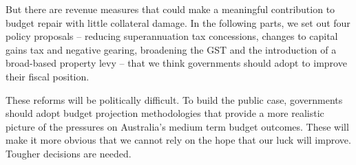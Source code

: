\documentclass[twoside,english]{Dianab5ona4portrait}
\begin{document}
But there are revenue measures that could make a meaningful contribution to budget repair with little collateral damage. In the following parts, we set out four policy proposals – reducing superannuation tax concessions, changes to capital gains tax and negative gearing, broadening the GST and the introduction of a broad-based property levy – that we think governments should adopt to improve their fiscal position.

These reforms will be politically difficult. To build the public case, governments should adopt budget projection methodologies that provide a more realistic picture of the pressures on Australia’s medium term budget outcomes. These will make it more obvious that we cannot rely on the hope that our luck will improve. Tougher decisions are needed. 

\end{document}
